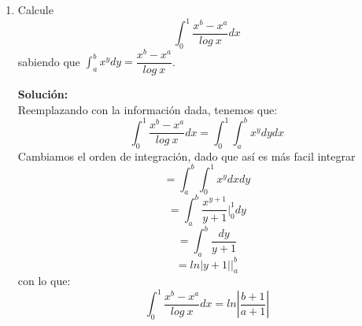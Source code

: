 \documentclass[12pt]{article}
\newenvironment{solucion}
{\begin{mdframed}[backgroundcolor=black!10]
		{\bf Solución:}\\
	}
	{
	\end{mdframed}
}
\newenvironment{preguntas}
{\begin{enumerate}\itemsep12pt
	}
	{
	\end{enumerate}
}
\newcommand{\ev}{\Big|}
\begin{document}
\begin{preguntas}
\begin{solucion}
\begin{enumerate}[a)]
\item $\displaystyle\int_2^4 \displaystyle\int_1^2 ye^{xy}dxdy = 
			\displaystyle\int_2^4 e^{xy} \ev_1^2 dy = 
			\displaystyle\int_2^4 e^{2y} - e^{y} dy =
			\dfrac{1}{2}e^{2y}\ev_2^4 - e^{y}\ev_2^4$\\
			$=\dfrac{1}{2}e^8 - \dfrac{1}{2}e^4 - e^4 + e^2 =
			\dfrac{1}{2}e^8 - \dfrac{3}{2}e^4 + e^2$	
\item $\displaystyle\int_{-1}^1\displaystyle\int_{-1}^1 \dfrac{xy}{1+x^2+y^2}dxdy = 
			\displaystyle\int_{-1}^1 \dfrac{y}{2} \displaystyle\int_{-1}^1 \dfrac{2x}{1+x^2+y^2}dxdy$\\
			$= \displaystyle\int_{-1}^1 \dfrac{y}{2} ln(1+x^2+y^2) \ev_{-1}^1 dy = 
			\displaystyle\int_{-1}^1 \dfrac{y}{2}( ln(2+y^2) - ln(2+y^2) ) dy$\\
			$=0$
\end{enumerate}
\end{solucion}
\item Calcule
	$$ \displaystyle\int_0^1 \dfrac{x^b - x^a}{log\ x}dx$$
	sabiendo que $\displaystyle\int_a^b x^y dy = \dfrac{x^b - x^a}{log\ x}$.
\begin{solucion}
Reemplazando con la información dada, tenemos que:
		$$ \displaystyle\int_0^1 \dfrac{x^b - x^a}{log\ x}dx = \displaystyle\int_0^1 \displaystyle\int_a^b x^y dydx $$
		Cambiamos el orden de integración, dado que así es más facil integrar
		$$ = \displaystyle\int_a^b \displaystyle\int_0^1 x^y dxdy $$
		$$ = \displaystyle\int_a^b \dfrac{x^{y+1}}{y+1} \ev_0^1 dy $$
		$$ = \displaystyle\int_a^b \dfrac{dy}{y+1} $$
		$$ = ln|y+1|\ev_a^b $$
		con lo que:
		$$ \displaystyle\int_0^1 \dfrac{x^b - x^a}{log\ x}dx = ln\left|\dfrac{b+1}{a+1}\right| $$
\end{solucion}
\end{preguntas}
\end{document}
